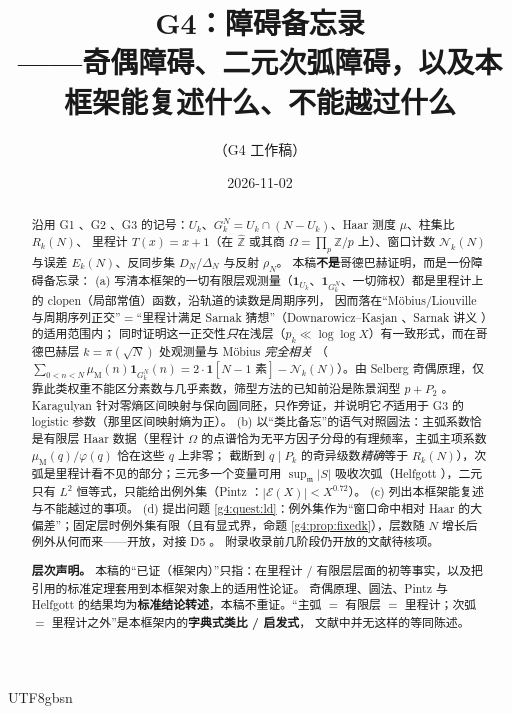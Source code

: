 \documentclass[11pt,a4paper]{article}
\newcommand{\Zhat}{\widehat{\mathbb Z}}
\newcommand{\Haar}{\mu}
\newcommand{\Cnt}{\mathcal N}          %
\newcommand{\Om}{\Omega}               %
\newcommand{\Mob}{\mu_{\mathrm{M}}}    %
\newcommand{\Exc}{\mathcal E}          %
\newcommand{\Min}{\mathfrak m}
\theoremstyle{plain}
\theoremstyle{definition}
\begin{document}
\begin{CJK}{UTF8}{gbsn}

\title{G4：障碍备忘录\\[2pt]
\large ——{}奇偶障碍、二元次弧障碍，以及本框架能复述什么、不能越过什么}
\author{（G4 工作稿）}
\date{2026-11-02}
\maketitle

\begin{abstract}
沿用 G1 \cite{G1}、G2 \cite{G2}、G3 \cite{G3} 的记号：$U_k$、$G_k^N=U_k\cap(N-U_k)$、Haar 测度 $\Haar$、柱集比 $R_k(N)$、
里程计 $T(x)=x+1$（在 $\Zhat$ 或其商 $\Om=\prod_p\mathbb Z/p$ 上）、窗口计数 $\Cnt_k(N)$ 与误差 $E_k(N)$、反同步集 $D_N$/$\Delta_N$ 与反射 $\rho_N$。
本稿\textbf{不是}哥德巴赫证明，而是一份障碍备忘录：
(a) 写清本框架的一切有限层观测量（$\mathbf 1_{U_k}$、$\mathbf 1_{G_k^N}$、一切筛权）都是里程计上的 clopen（局部常值）函数，沿轨道的读数是周期序列，
因而落在“M\"obius/Liouville 与周期序列正交”$=$“里程计满足 Sarnak 猜想”（Downarowicz--Kasjan \cite{DK15}、Sarnak 讲义 \cite{Sar10}）的适用范围内；
同时证明这一正交性\emph{只}在浅层（$p_k\ll\log\log X$）有一致形式，而在哥德巴赫层 $k=\pi(\sqrt N)$ 处观测量与 M\"obius \emph{完全相关}
（$\sum_{0<n<N}\Mob(n)\mathbf 1_{G_k^N}(n)=2\cdot\mathbf 1[N-1\text{ 素}]-\Cnt_k(N)$）。由 Selberg 奇偶原理，仅靠此类权重不能区分素数与几乎素数，筛型方法的已知前沿是陈景润型 $p+P_2$ \cite{Chen73}。
Karagulyan \cite{Kar15} 针对零熵区间映射与保向圆同胚，只作旁证，并说明它\emph{不}适用于 G3 的 logistic 参数（那里区间映射熵为正）。
(b) 以“类比备忘”的语气对照圆法：主弧系数恰是有限层 Haar 数据（里程计 $\Om$ 的点谱恰为无平方因子分母的有理频率，主弧主项系数 $\Mob(q)/\varphi(q)$ 恰在这些 $q$ 上非零；
截断到 $q\mid P_k$ 的奇异级数\emph{精确}等于 $R_k(N)$），次弧是里程计看不见的部分；三元多一个变量可用 $\sup_{\Min}|S|$ 吸收次弧（Helfgott \cite{Hel13,Hel15}），二元只有 $L^2$ 恒等式，只能给出例外集（Pintz \cite{Pin18}：$|\Exc(X)|<X^{0.72}$）。
(c) 列出本框架能复述与不能越过的事项。
(d) 提出问题 \ref{g4:quest:ld}：例外集作为“窗口命中相对 Haar 的大偏差”；固定层时例外集有限（且有显式界，命题 \ref{g4:prop:fixedk}），层数随 $N$ 增长后例外从何而来——开放，对接 D5 \cite{D5}。
附录收录前几阶段仍开放的文献待核项。

\textbf{层次声明。} 本稿的“已证（框架内）”只指：在里程计 / 有限层层面的初等事实，以及把引用的标准定理套用到本框架对象上的适用性论证。
奇偶原理、圆法、Pintz 与 Helfgott 的结果均为\textbf{标准结论转述}，本稿不重证。“主弧 $=$ 有限层 $=$ 里程计；次弧 $=$ 里程计之外”是本框架内的\textbf{字典式类比 / 启发式}，
文献中并无这样的等同陈述。


\end{abstract}
\end{CJK}
\end{document}
